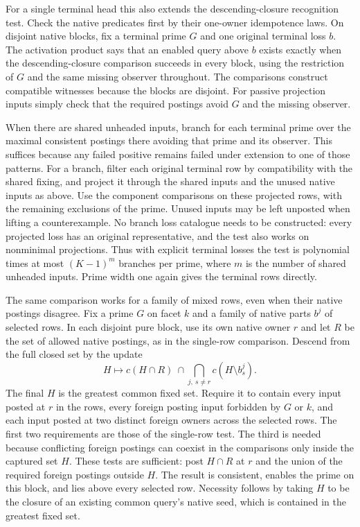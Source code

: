 For a single terminal head this also extends the
descending-closure recognition test. Check the native
predicates first by their one-owner idempotence laws.
On disjoint native blocks, fix a terminal prime $G$
and one original terminal loss $b$. The activation
product says that an enabled query above $b$ exists
exactly when the descending-closure comparison succeeds
in every block, using the restriction of $G$ and the
same missing observer throughout. The comparisons
construct compatible witnesses because the blocks
are disjoint. For passive projection inputs simply
check that the required postings avoid $G$ and the
missing observer.

When there are shared unheaded inputs, branch for
each terminal prime over the maximal consistent
postings there avoiding that prime and its observer.
This suffices because any failed positive remains
failed under extension to one of those patterns.
For a branch, filter each original terminal row by
compatibility with the shared fixing, and project it
through the shared inputs and the unused native
inputs as above. Use the component comparisons on
these projected rows, with the remaining exclusions
of the prime. Unused inputs may be left unposted
when lifting a counterexample. No branch loss
catalogue needs to be constructed: every projected
loss has an original representative, and the test
also works on nonminimal projections. Thus with
explicit terminal losses the test is polynomial
times at most $(K-1)^m$ branches per prime, where
$m$ is the number of shared unheaded inputs. Prime
width one again gives the terminal rows directly.

The same comparison works for a family of mixed rows,
even when their native postings disagree. Fix a prime
$G$ on facet $k$ and a family of native parts $b^j$ of
selected rows. In each disjoint pure block, use its own
native owner $r$ and let $R$ be the set of allowed native
postings, as in the single-row comparison. Descend from
the full closed set by the update
\[
            H\longmapsto c(H\cap R)
             \ \cap\!\!\bigcap_{j,\ s\ne r}c(H\setminus b^j_s).
\]
The final $H$ is the greatest common fixed set.
Require it to contain every input posted at $r$ in
the rows, every foreign posting input forbidden by
$G$ or $k$, and each input posted at two distinct
foreign owners across the selected rows. The first
two requirements are those of the single-row test.
The third is needed because conflicting foreign
postings can coexist in the comparisons only inside
the captured set $H$. These tests are sufficient:
post $H\cap R$ at $r$ and the union of the required
foreign postings outside $H$. The result is
consistent, enables the prime on this block, and
lies above every selected row. Necessity follows by
taking $H$ to be the closure of an existing common
query's native seed, which is contained in the
greatest fixed set.

